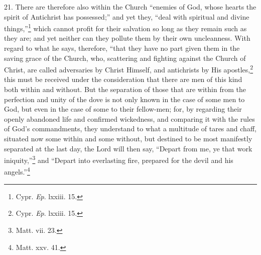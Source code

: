 21. There are therefore also within the Church ``enemies of God, whose hearts the spirit of Antichrist has possessed;'' and yet they, ``deal with spiritual and divine things,''\footnote{\par  Cypr. \emph{Ep}. lxxiii. 15.} which cannot profit for their salvation so long as they remain such as they are; and yet neither can they pollute them by their own uncleanness. With regard to what he says, therefore, ``that they have no part given them in the saving grace of the Church, who, scattering and fighting against the Church of Christ, are called adversaries by Christ Himself, and antichrists by His apostles,\footnote{\par  Cypr. \emph{Ep}. lxxiii. 15.} this must be received under the consideration that there are men of this kind both within and without. But the separation of those that are within from the perfection and unity of the dove is not only known in the case of some men to God, but even in the case of some to their fellow-men; for, by regarding their openly abandoned life and confirmed wickedness, and comparing it with the rules of God’s commandments, they understand to what a multitude of tares and chaff, situated now some within and some without, but destined to be most manifestly separated at the last day, the Lord will then say, ``Depart from me, ye that work iniquity,''\footnote{\par  Matt. vii. 23.} and ``Depart into everlasting fire, prepared for the devil and his angels.''\footnote{\par  Matt. xxv. 41.}


